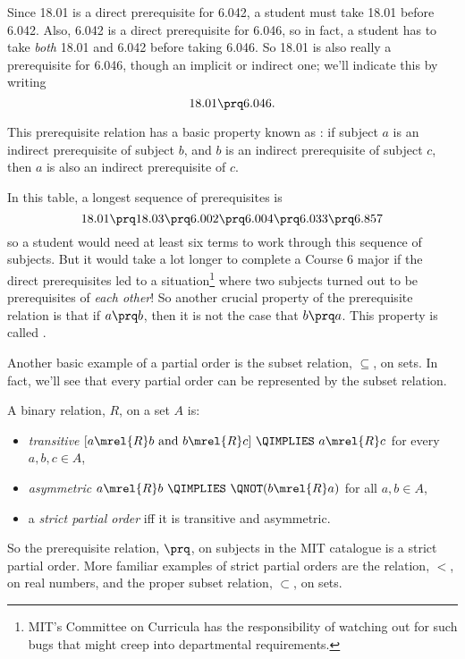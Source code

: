 \begin{definition}
Since 18.01 is a direct prerequisite for 6.042, a student must take 18.01
before 6.042.  Also, 6.042 is a direct prerequisite for 6.046, so in fact,
a student has to take \emph{both} 18.01 and 6.042 before taking 6.046.  So
18.01 is also really a prerequisite for 6.046, though an implicit or
indirect one; we'll indicate this by writing
\[
18.01 \prq 6.046.
\]

This prerequisite relation has a basic property known as
: if subject $a$ is an indirect prerequisite of
subject $b$, and $b$ is an indirect prerequisite of subject $c$, then
$a$ is also an indirect prerequisite of $c$.

In this table, a longest sequence of prerequisites is
\[
18.01 \prq 18.03 \prq 6.002 \prq 6.004 \prq 6.033 \prq 6.857
\]
so a student would need at least six terms to work through this sequence
of subjects.  But it would take a lot longer to complete a Course 6 major
if the direct prerequisites led to a situation\footnote{MIT's Committee on
Curricula has the responsibility of watching out for such bugs that might
creep into departmental requirements.} where two subjects turned out to be
prerequisites of \emph{each other}!  So another crucial property of the
prerequisite relation is that if $a \prq b$, then it is not the case that
$b \prq a$.  This property is called .

Another basic example of a partial order is the subset relation,
$\subseteq$, on sets.  In fact, we'll see that every partial order can be
represented by the subset relation.

\begin{definition}
A binary relation, $R$, on a set $A$ is:
\begin{itemize}

\item \emph{transitive} \qiff 
$[a \mrel{R}  b \text{ and } b \mrel{R}  c]\ \QIMPLIES\  a \mrel{R}  c$
\quad for every $a,b,c\in A$,

\item \emph{asymmetric} \qiff
$a \mrel{R}  b\  \QIMPLIES\  \QNOT(b \mrel{R}  a)$
\quad for all $a,b\in A$,

\item a \emph{strict partial order} iff it is transitive and asymmetric.
\end{itemize}

\end{definition}

So the prerequisite relation, $\prq$, on subjects in the MIT catalogue is
a strict partial order.  More familiar examples of strict partial orders
are the relation, $<$, on real numbers, and the proper subset relation,
$\subset$, on sets.
\fi


\end{definition}
